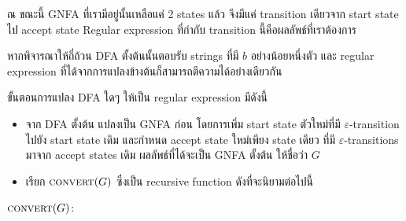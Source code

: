 \begin{example}
\begin{center}
\end{center}
ณ ขณะนี้ GNFA ที่เรามีอยู่นั้นเหลือแค่ 2 states แล้ว จึงมีแค่ transition เดียวจาก start state ไป accept state \enskip Regular expression ที่กำกับ transition นี้คือผลลัพธ์ที่เราต้องการ

หากพิจารณาให้ถี่ถ้วน DFA ตั้งต้นนั้นตอบรับ strings ที่มี $b$ อย่างน้อยหนึ่งตัว และ regular expression ที่ได้จากการแปลงข้างต้นก็สามารถตีความได้อย่างเดียวกัน
\end{example}

ขั้นตอนการแปลง DFA ใดๆ ให้เป็น regular expression มีดังนี้
\begin{itemize}
\item จาก DFA ตั้งต้น แปลงเป็น GNFA ก่อน โดยการเพิ่ม start state ตัวใหม่ที่มี $\varepsilon$-transition ไปยัง start state เดิม และกำหนด accept state ใหม่เพียง state เดียว ที่มี $\varepsilon$-transitions มาจาก accept states เดิม \enskip ผลลัพธ์ที่ได้จะเป็น GNFA ตั้งต้น ให้ชื่อว่า $G$
\item เรียก $\textsc{convert}(G)$ ซึ่งเป็น recursive function ดังที่จะนิยามต่อไปนี้
\end{itemize}
$\textsc{convert}(G)$:
